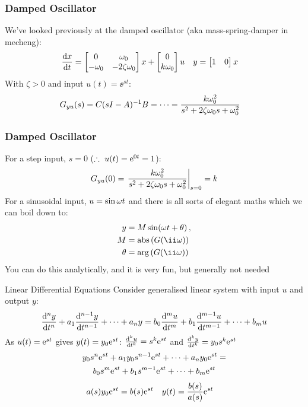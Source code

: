 \documentclass{beamer-control}
\begin{document}
\begin{frame}
\frametitle{Damped Oscillator }
We've looked previously at the damped oscillator (aka mass-spring-damper in mecheng):
\begin{align}
\frac{\mathrm{d} x}{\mathrm{d} t} &= \begin{bmatrix}0 & \omega_0\\ -\omega_0 & -2\zeta\omega_0\end{bmatrix}x+\begin{bmatrix}0\\ k\omega_0\end{bmatrix}u & y&= \begin{bmatrix}1 & 0\end{bmatrix} x
\end{align}
With $\zeta>0$ and input $u(t)=\ee^{s t}$:
\begin{align}
G_{yu}(s) &= C(sI-A)^{-1} B = \cdots = \frac{k \omega_0^2}{s^2 + 2\zeta\omega_0 s + \omega_0^2}
\end{align}
\end{frame}


\begin{frame}
\frametitle{Damped Oscillator }
For a step input, $s=0$ ($\therefore~ u(t) = \mathrm{e}^{0 t} = 1$):
\begin{align}
G_{yu}(0) = \left.\frac{k \omega_0^2}{s^2 + 2\zeta\omega_0 s + \omega_0^2}\right|_{s=0} = k
\end{align}
For a sinusoidal input, $u=\sin\omega t$ and there is all sorts of elegant maths which we can boil down to:
\begin{align}
y &= M \sin(\ww t + \theta) \,, \\
M &= \abs\left( G(\ii\ww) \right) \\
\theta &= \arg\left( G(\ii\ww) \right)
\end{align}
You can do this analytically, and it is very fun, but generally not needed
\end{frame}



\begin{frame}{Linear Differential Equations}
Consider generalised linear system with input $u$ and output $y$:
\begin{align}
\frac{\mathrm{d} ^n y}{\mathrm{d} t^n} + a_1 \frac{\mathrm{d} ^{n-1} y}{\mathrm{d} t^{n-1}} + \cdots + a_n y = 
b_0 \frac{\mathrm{d} ^m u}{\mathrm{d} t^m} + b_1 \frac{\mathrm{d} ^{m-1} u}{\mathrm{d} t^{m-1}} + \cdots + b_m u
\end{align}
As $u(t)=\mathrm{e}^{s t}$ gives $y(t)=y_0 \mathrm{e}^{s t}$:
\begin{math}
\frac{\mathrm{d} ^k u}{\mathrm{d} t^k} = s^k \mathrm{e}^{s t}
\end{math}
and
\begin{math}
\frac{\mathrm{d} ^k y}{\mathrm{d} t^k} = y_0 s^k \mathrm{e}^{s t} 
\end{math}
\begin{multline}
y_0 s^n \mathrm{e}^{s t} + a_1 y_0 s^{n-1} \mathrm{e}^{s t} + \cdots + a_n y_0 \mathrm{e}^{s t} = \\
b_0 s^m \mathrm{e}^{s t} + b_1 s^{m-1} \mathrm{e}^{s t} + \cdots + b_m \mathrm{e}^{s t}
\end{multline}
\begin{align}
a(s) y_0 \mathrm{e}^{s t} &= b(s) \mathrm{e}^{s t} & y(t) &= \frac{b(s)}{a(s)}\mathrm{e}^{s t}
\end{align}
\end{frame}
\end{document}
